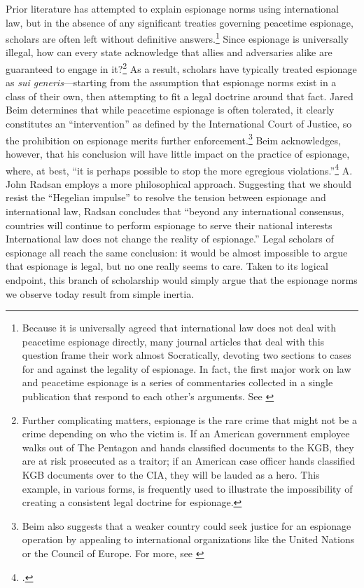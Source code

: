 \documentclass[14pt]{extarticle}
\begin{document}
Prior literature has attempted to explain espionage norms using international law, but in the absence of any significant treaties governing peacetime espionage, scholars are often left without definitive answers.\footnote{Because it is universally agreed that international law does not deal with peacetime espionage directly, many journal articles that deal with this question frame their work almost Socratically, devoting two sections to cases for and against the legality of espionage. In fact, the first major work on law and peacetime espionage is a series of commentaries collected in a single publication that respond to each other's arguments. See \cite{wright_essays_1962}} Since espionage is universally illegal, how can every state acknowledge that allies and adversaries alike are guaranteed to engage in it?\footnote{Further complicating matters, espionage is the rare crime that might not be a crime depending on who the victim is. If an American government employee walks out of The Pentagon and hands classified documents to the KGB, they are at risk prosecuted as a traitor; if an American case officer hands classified KGB documents over to the CIA, they will be lauded as a hero. This example, in various forms, is frequently used to illustrate the impossibility of creating a consistent legal doctrine for espionage.} As a result, scholars have typically treated espionage as \emph{sui generis}---starting from the assumption that espionage norms exist in a class of their own, then attempting to fit a legal doctrine around that fact. Jared Beim determines that while peacetime espionage is often tolerated, it clearly constitutes an \enquote{intervention} as defined by the International Court of Justice, so the prohibition on espionage merits further enforcement.\footnote{Beim also suggests that a weaker country could seek justice for an espionage operation by appealing to international organizations like the United Nations or the Council of Europe. For more, see \cite{beim_enforcing_2018}} Beim acknowledges, however, that his conclusion will have little impact on the practice of espionage, where, at best, \enquote{it is perhaps possible to stop the more egregious violations.}\footcite[p.~672]{beim_enforcing_2018} A. John Radsan employs a more philosophical approach. Suggesting that we should resist the \enquote{Hegelian impulse} to resolve the tension between espionage and international law, Radsan concludes that \enquote{beyond any international consensus, countries will continue to perform espionage to serve their national interests \textelp{} International law does not change the reality of espionage.} Legal scholars of espionage all reach the same conclusion: it would be almost impossible to argue that espionage is legal, but no one really seems to care. Taken to its logical endpoint, this branch of scholarship would simply argue that the espionage norms we observe today result from simple inertia.
\end{document}
